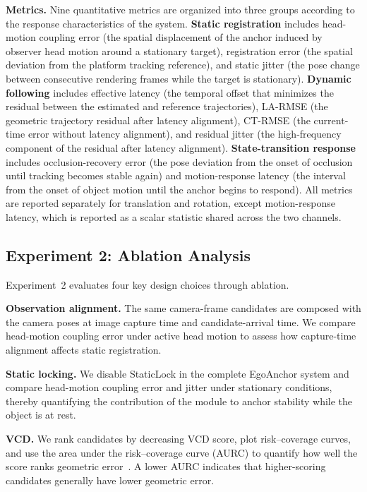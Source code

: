 \documentclass[review]{vgtc}
\begin{document}
\textbf{Metrics.}
Nine quantitative metrics are organized into three groups according to the response characteristics of the system. \textbf{Static registration} includes head-motion coupling error (the spatial displacement of the anchor induced by observer head motion around a stationary target), registration error (the spatial deviation from the platform tracking reference), and static jitter (the pose change between consecutive rendering frames while the target is stationary). \textbf{Dynamic following} includes effective latency (the temporal offset that minimizes the residual between the estimated and reference trajectories), LA-RMSE (the geometric trajectory residual after latency alignment), CT-RMSE (the current-time error without latency alignment), and residual jitter (the high-frequency component of the residual after latency alignment). \textbf{State-transition response} includes occlusion-recovery error (the pose deviation from the onset of occlusion until tracking becomes stable again) and motion-response latency (the interval from the onset of object motion until the anchor begins to respond). All metrics are reported separately for translation and rotation, except motion-response latency, which is reported as a scalar statistic shared across the two channels.

\subsection{Experiment 2: Ablation Analysis}\label{sec:exp2-design}

Experiment~2 evaluates four key design choices through ablation.

\textbf{Observation alignment.}
The same camera-frame candidates are composed with the camera poses at image capture time and candidate-arrival time. We compare head-motion coupling error under active head motion to assess how capture-time alignment affects static registration.

\textbf{Static locking.}
We disable StaticLock in the complete EgoAnchor system and compare head-motion coupling error and jitter under stationary conditions, thereby quantifying the contribution of the module to anchor stability while the object is at rest.

\textbf{VCD.}
We rank candidates by decreasing VCD score, plot risk--coverage curves, and use the area under the risk--coverage curve (AURC) to quantify how well the score ranks geometric error~\cite{riskcontrolled2020,ding2020uncertainty}. A lower AURC indicates that higher-scoring candidates generally have lower geometric error.
\end{document}
